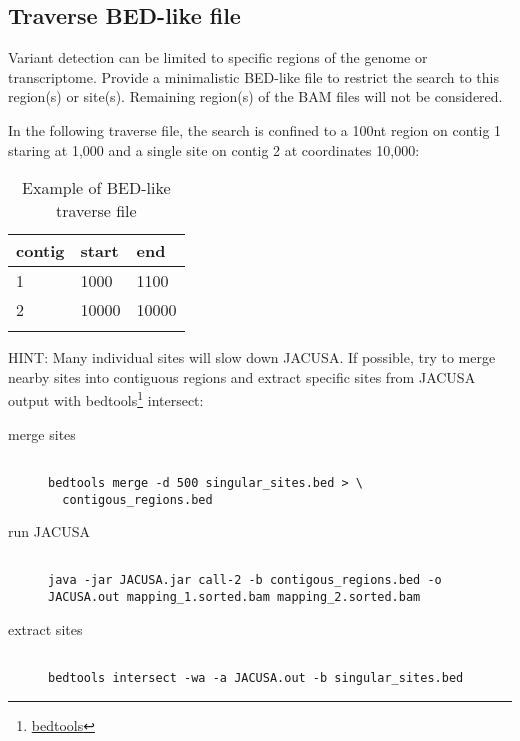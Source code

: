 \documentclass[10pt, a4paper]{article}
\begin{document}
\subsection{Traverse BED-like file}
Variant detection can be limited to specific regions of the genome or transcriptome.  Provide a
minimalistic BED-like file to restrict the search to this region(s) or site(s). Remaining region(s)
of the BAM files will not be considered.

In the following traverse file, the search is confined to a 100nt region on contig 1
staring at 1,000 and a single site on contig 2 at coordinates 10,000:
\begin{table}
\centering
\caption{Example of BED-like traverse file}
\label{tb:traverse_file}
\begin{tabular}{lll}
\textbf{contig} & \textbf{start} & \textbf{end} \\
\hline
1 & 1000 & 1100 \\
2 & 10000 & 10000 \\
\multicolumn{3}{c}{}
\end{tabular}
\end{table}
HINT: Many individual sites will slow down JACUSA. If possible, try to merge nearby sites into
contiguous regions and extract specific sites from JACUSA output with
bedtools\footnote{\href{http://bedtools.readthedocs.org/en/latest/}{bedtools}} intersect:
\begin{description}
\item[merge sites] \begin{verbatim} 

bedtools merge -d 500 singular_sites.bed > \ 
  contigous_regions.bed
\end{verbatim}
\item[run JACUSA] \begin{verbatim} 

java -jar JACUSA.jar call-2 -b contigous_regions.bed -o
JACUSA.out mapping_1.sorted.bam mapping_2.sorted.bam
\end{verbatim}
\item[extract sites] \begin{verbatim}

bedtools intersect -wa -a JACUSA.out -b singular_sites.bed
\end{verbatim}
\end{description}
\end{document}
